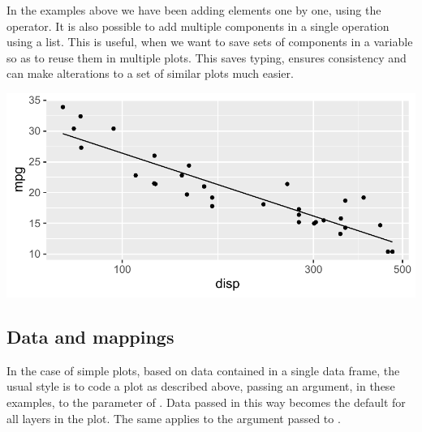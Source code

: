 \documentclass[krantz2]{krantz}\usepackage{knitr}
\begin{document}
\begin{infobox}
  In the examples above we have been adding elements one by one, using the \code{+} operator. It is also possible to add multiple components in a single operation using a list. This is useful, when we want to save sets of components in a variable so as to reuse them in multiple plots. This saves typing, ensures consistency and can make alterations to a set of similar plots much easier.

\begin{knitrout}\footnotesize
{}\color{fgcolor}\begin{kframe}
\begin{alltt}
 \hlkwb{<-} \hlstd{(}
  \hlstd{(} \hlstd{=} \hlstd{,}  \hlstd{=} \hlstd{,}   \hlopt{~} 
  \hlstd{())}
\end{alltt}
\end{kframe}
\end{knitrout}

\begin{knitrout}\footnotesize
{}\color{fgcolor}\begin{kframe}
\begin{alltt}
 \hlopt{+} 
\end{alltt}
\end{kframe}

{\centering \includegraphics[width=.7\textwidth]{figure/pos-ggplot-objects-info-02-1} 

}


\end{knitrout}

\end{infobox}

\subsection{Data and mappings}
In the case of simple plots, based on data contained in a single data frame, the usual style is to code a plot as described above, passing an argument,  in these examples, to the  parameter of . Data passed in this way becomes the default for all layers in the plot. The same applies to the argument passed to .
\end{document}
